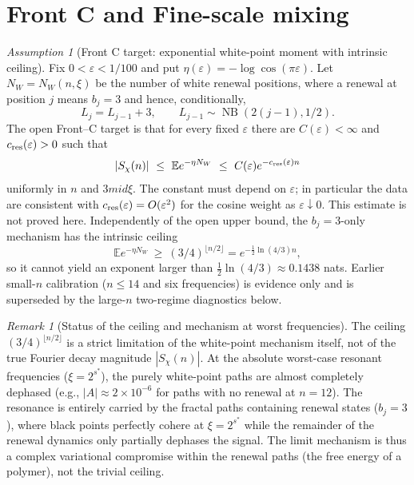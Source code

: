 \documentclass[12pt,a4paper]{article}
\theoremstyle{remark}
\newtheorem{remark}[theorem]{Remark}
\newtheorem{assumption}[theorem]{Assumption}
\begin{document}
\section{Front C and Fine-scale mixing}
\label{sec:front_c}
\begin{assumption}[Front C target: exponential white-point moment with intrinsic ceiling]
\label{lem:front_c2}
Fix $0<\varepsilon<1/100$ and put
$\eta(\varepsilon)=-\log\cos(\pi\varepsilon)$.  Let $N_W=N_W(n,\xi)$
be the number of white renewal positions, where a renewal at position $j$ means
$b_j=3$ and hence, conditionally,
\[
L_j=L_{j-1}+3,\qquad L_{j-1}\sim\operatorname{NB}(2(j-1),1/2).
\]
The open Front--C target is that for every fixed $\varepsilon$ there are
$C(\varepsilon)<\infty$ and $c_{\rm res}(\varepsilon)>0$ such that
\[
|S_\chi(n)|\ \le\ \mathbb E e^{-\eta N_W}
\ \le\ C(\varepsilon)e^{-c_{\rm res}(\varepsilon)n}
\]
uniformly in $n$ and $3
mid\xi$.  The constant must depend on $\varepsilon$;
in particular the data are consistent with
$c_{\rm res}(\varepsilon)=O(\varepsilon^2)$ for the cosine weight as
$\varepsilon\downarrow0$.  This estimate is not proved here.
Independently of the open upper bound, the $b_j=3$-only mechanism has the
intrinsic ceiling
\[
\mathbb E e^{-\eta N_W}\ \ge\ (3/4)^{\lfloor n/2\rfloor}
=e^{-\frac12\ln(4/3)n},
\]
so it cannot yield an exponent larger than
$\tfrac12\ln(4/3)\approx0.1438$ nats.  Earlier small-$n$ calibration
($n\le14$ and six frequencies) is evidence only and is superseded by the
large-$n$ two-regime diagnostics below.
\end{assumption}
\begin{remark}[Status of the ceiling and mechanism at worst frequencies]
The ceiling $(3/4)^{\lfloor n/2\rfloor}$ is a strict limitation of the white-point mechanism itself, not of the true Fourier decay magnitude $|S_\chi(n)|$. At the absolute worst-case resonant frequencies ($\xi = 2^{s^*}$), the purely white-point paths are almost completely dephased (e.g., $|A| \approx 2 \times 10^{-6}$ for paths with no renewal at $n=12$). The resonance is entirely carried by the fractal paths containing renewal states ($b_j = 3$), where black points perfectly cohere at $\xi = 2^{s^*}$ while the remainder of the renewal dynamics only partially dephases the signal. The limit mechanism is thus a complex variational compromise within the renewal paths (the free energy of a polymer), not the trivial ceiling.
\end{remark}
\end{document}
